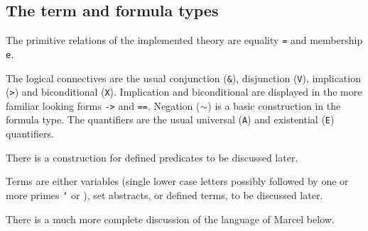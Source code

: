 \documentclass{article}
\begin{document}
\subsection{The term and formula types}

The primitive relations of the implemented theory are equality {\tt =} and membership {\tt e}.

The logical connectives are the usual conjunction ({\tt \&}), disjunction ({\tt V}), implication ({\tt >}) and biconditional ({\tt X}).  Implication and biconditional are displayed in the more familiar looking forms {\tt ->} and {\tt ==}.  Negation ({\tt $\sim$}) is
a basic construction in the formula type.  The quantifiers are the usual universal ({\tt A}) and existential ({\tt E}) quantifiers.

There is a construction for defined predicates to be discussed later.

Terms are either variables (single lower case letters possibly followed by one or more primes {\tt `} or {\tt *}), set abstracts, or defined terms, to be discussed later.

There is a much more complete discussion of the language of Marcel below.
\end{document}
